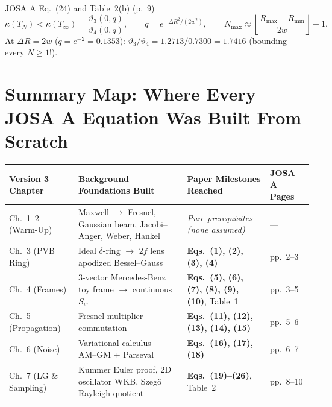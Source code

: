 \documentclass[10pt,letterpaper]{article}
\numberwithin{equation}{section}
\begin{document}
\begin{paperhit}{JOSA A Eq.~(24) and Table~2(b) (p.~9)}
\[
  \kappa(T_N) < \kappa(T_\infty) = \frac{\vartheta_3(0,q)}{\vartheta_4(0,q)}, \qquad q = e^{-\Delta R^2/(2w^2)}, \qquad N_{\max} \approx \left\lfloor \frac{R_{\max}-R_{\min}}{2w}\right\rfloor + 1.
\]
At $\Delta R = 2w$ ($q = e^{-2} = 0.1353$): $\vartheta_3/\vartheta_4 = 1.2713/0.7300 = \mathbf{1.7416}$ (bounding every $N \ge 1$!).
\end{paperhit}

\section*{Summary Map: Where Every JOSA A Equation Was Built From Scratch}

\begin{table}[ht!]
\centering
\scriptsize
\renewcommand{\arraystretch}{1.12}
\setlength{\tabcolsep}{5pt}
\begin{tabular}{@{}llll@{}}
\toprule
\textbf{Version 3 Chapter} & \textbf{Background Foundations Built} & \textbf{Paper Milestones Reached} & \textbf{JOSA A Pages} \\
\midrule
Ch.~1--2 (Warm-Up) & Maxwell $\to$ Fresnel, Gaussian beam, Jacobi--Anger, Weber, Hankel & \emph{Pure prerequisites (none assumed)} & --- \\
Ch.~3 (PVB Ring) & Ideal $\delta$-ring $\to$ $2f$ lens apodized Bessel--Gauss & \textbf{Eqs.~(1), (2), (3), (4)} & pp.~2--3 \\
Ch.~4 (Frames) & 3-vector Mercedes-Benz toy frame $\to$ continuous $S_w$ & \textbf{Eqs.~(5), (6), (7), (8), (9), (10)}, Table~1 & pp.~3--5 \\
Ch.~5 (Propagation) & Fresnel multiplier commutation & \textbf{Eqs.~(11), (12), (13), (14), (15)} & pp.~5--6 \\
Ch.~6 (Noise) & Variational calculus + AM--GM + Parseval & \textbf{Eqs.~(16), (17), (18)} & pp.~6--7 \\
Ch.~7 (LG \& Sampling) & Kummer Euler proof, 2D oscillator WKB, Szeg\H{o} Rayleigh quotient & \textbf{Eqs.~(19)--(26)}, Table~2 & pp.~8--10 \\
\bottomrule
\end{tabular}
\end{table}
\end{document}
